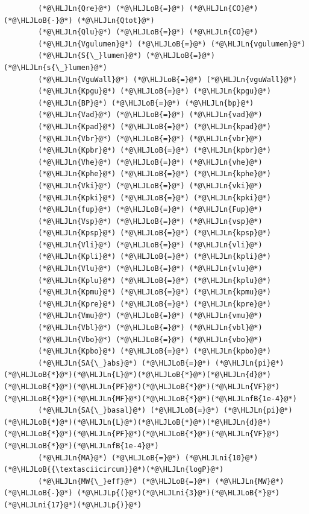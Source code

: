 \documentclass[12pt,a4paper]{article}
\newcommand{\HLJLn}[1]{#1}
\newcommand{\HLJLnfB}[1]{\textcolor[RGB]{59,151,46}{#1}}
\newcommand{\HLJLni}[1]{\textcolor[RGB]{59,151,46}{#1}}
\newcommand{\HLJLoB}[1]{\textcolor[RGB]{102,102,102}{\textbf{#1}}}
\newcommand{\HLJLp}[1]{#1}
\begin{document}
\begin{lstlisting}
        (*@\HLJLn{Qre}@*) (*@\HLJLoB{=}@*) (*@\HLJLn{CO}@*) (*@\HLJLoB{-}@*) (*@\HLJLn{Qtot}@*)
        (*@\HLJLn{Qlu}@*) (*@\HLJLoB{=}@*) (*@\HLJLn{CO}@*)
        (*@\HLJLn{Vgulumen}@*) (*@\HLJLoB{=}@*) (*@\HLJLn{vgulumen}@*)
        (*@\HLJLn{S{\_}lumen}@*) (*@\HLJLoB{=}@*) (*@\HLJLn{s{\_}lumen}@*)
        (*@\HLJLn{VguWall}@*) (*@\HLJLoB{=}@*) (*@\HLJLn{vguWall}@*)
        (*@\HLJLn{Kpgu}@*) (*@\HLJLoB{=}@*) (*@\HLJLn{kpgu}@*)
        (*@\HLJLn{BP}@*) (*@\HLJLoB{=}@*) (*@\HLJLn{bp}@*)
        (*@\HLJLn{Vad}@*) (*@\HLJLoB{=}@*) (*@\HLJLn{vad}@*)
        (*@\HLJLn{Kpad}@*) (*@\HLJLoB{=}@*) (*@\HLJLn{kpad}@*)
        (*@\HLJLn{Vbr}@*) (*@\HLJLoB{=}@*) (*@\HLJLn{vbr}@*)
        (*@\HLJLn{Kpbr}@*) (*@\HLJLoB{=}@*) (*@\HLJLn{kpbr}@*)
        (*@\HLJLn{Vhe}@*) (*@\HLJLoB{=}@*) (*@\HLJLn{vhe}@*)
        (*@\HLJLn{Kphe}@*) (*@\HLJLoB{=}@*) (*@\HLJLn{kphe}@*)
        (*@\HLJLn{Vki}@*) (*@\HLJLoB{=}@*) (*@\HLJLn{vki}@*)
        (*@\HLJLn{Kpki}@*) (*@\HLJLoB{=}@*) (*@\HLJLn{kpki}@*)
        (*@\HLJLn{fup}@*) (*@\HLJLoB{=}@*) (*@\HLJLn{Fup}@*)
        (*@\HLJLn{Vsp}@*) (*@\HLJLoB{=}@*) (*@\HLJLn{vsp}@*)
        (*@\HLJLn{Kpsp}@*) (*@\HLJLoB{=}@*) (*@\HLJLn{kpsp}@*)
        (*@\HLJLn{Vli}@*) (*@\HLJLoB{=}@*) (*@\HLJLn{vli}@*)
        (*@\HLJLn{Kpli}@*) (*@\HLJLoB{=}@*) (*@\HLJLn{kpli}@*)
        (*@\HLJLn{Vlu}@*) (*@\HLJLoB{=}@*) (*@\HLJLn{vlu}@*)
        (*@\HLJLn{Kplu}@*) (*@\HLJLoB{=}@*) (*@\HLJLn{kplu}@*)
        (*@\HLJLn{Kpmu}@*) (*@\HLJLoB{=}@*) (*@\HLJLn{kpmu}@*)
        (*@\HLJLn{Kpre}@*) (*@\HLJLoB{=}@*) (*@\HLJLn{kpre}@*)
        (*@\HLJLn{Vmu}@*) (*@\HLJLoB{=}@*) (*@\HLJLn{vmu}@*)
        (*@\HLJLn{Vbl}@*) (*@\HLJLoB{=}@*) (*@\HLJLn{vbl}@*)
        (*@\HLJLn{Vbo}@*) (*@\HLJLoB{=}@*) (*@\HLJLn{vbo}@*)
        (*@\HLJLn{Kpbo}@*) (*@\HLJLoB{=}@*) (*@\HLJLn{kpbo}@*)
        (*@\HLJLn{SA{\_}abs}@*) (*@\HLJLoB{=}@*) (*@\HLJLn{pi}@*)(*@\HLJLoB{*}@*)(*@\HLJLn{L}@*)(*@\HLJLoB{*}@*)(*@\HLJLn{d}@*)(*@\HLJLoB{*}@*)(*@\HLJLn{PF}@*)(*@\HLJLoB{*}@*)(*@\HLJLn{VF}@*)(*@\HLJLoB{*}@*)(*@\HLJLn{MF}@*)(*@\HLJLoB{*}@*)(*@\HLJLnfB{1e-4}@*)
        (*@\HLJLn{SA{\_}basal}@*) (*@\HLJLoB{=}@*) (*@\HLJLn{pi}@*)(*@\HLJLoB{*}@*)(*@\HLJLn{L}@*)(*@\HLJLoB{*}@*)(*@\HLJLn{d}@*)(*@\HLJLoB{*}@*)(*@\HLJLn{PF}@*)(*@\HLJLoB{*}@*)(*@\HLJLn{VF}@*)(*@\HLJLoB{*}@*)(*@\HLJLnfB{1e-4}@*)
        (*@\HLJLn{MA}@*) (*@\HLJLoB{=}@*) (*@\HLJLni{10}@*)(*@\HLJLoB{{\textasciicircum}}@*)(*@\HLJLn{logP}@*)
        (*@\HLJLn{MW{\_}eff}@*) (*@\HLJLoB{=}@*) (*@\HLJLn{MW}@*) (*@\HLJLoB{-}@*) (*@\HLJLp{(}@*)(*@\HLJLni{3}@*)(*@\HLJLoB{*}@*)(*@\HLJLni{17}@*)(*@\HLJLp{)}@*)

\end{lstlisting}
\end{document}
